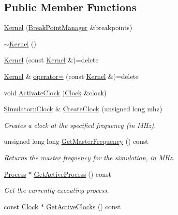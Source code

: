 \subsection*{Public Member Functions}
\begin{DoxyCompactItemize}
\item 
\hyperlink{class_simulator_1_1_kernel_aa5884ec5c226d80b3b66d28b420b38b2}{Kernel} (\hyperlink{class_simulator_1_1_break_point_manager}{Break\+Point\+Manager} \&breakpoints)
\item 
\hyperlink{class_simulator_1_1_kernel_a86bb0e9f2bd1418b975a8144966ab18b}{$\sim$\+Kernel} ()
\item 
\hyperlink{class_simulator_1_1_kernel_a59cea6da9f62b4f048581017a976d546}{Kernel} (const \hyperlink{class_simulator_1_1_kernel}{Kernel} \&)=delete
\item 
\hyperlink{class_simulator_1_1_kernel}{Kernel} \& \hyperlink{class_simulator_1_1_kernel_ae2acb85d7a5011c0eeaaa3555a78ed01}{operator=} (const \hyperlink{class_simulator_1_1_kernel}{Kernel} \&)=delete
\item 
void \hyperlink{class_simulator_1_1_kernel_a85b974b369a76becd119496a3f339ea2}{Activate\+Clock} (\hyperlink{class_simulator_1_1_clock}{Clock} \&clock)
\item 
\hyperlink{class_simulator_1_1_clock}{Simulator\+::\+Clock} \& \hyperlink{class_simulator_1_1_kernel_ae85126f35f2be33dfe63cd4f333e27e8}{Create\+Clock} (unsigned long mhz)
\begin{DoxyCompactList}\small\item\em Creates a clock at the specified frequency (in M\+Hz). \end{DoxyCompactList}\item 
unsigned long long \hyperlink{class_simulator_1_1_kernel_afbf48e6e87a025004375f9c44375e0b9}{Get\+Master\+Frequency} () const 
\begin{DoxyCompactList}\small\item\em Returns the master frequency for the simulation, in M\+Hz. \end{DoxyCompactList}\item 
\hyperlink{class_simulator_1_1_process}{Process} $\ast$ \hyperlink{class_simulator_1_1_kernel_ad2600c251b36facc96fb2f0255834e7e}{Get\+Active\+Process} () const 
\begin{DoxyCompactList}\small\item\em Get the currently executing process. \end{DoxyCompactList}\item 
const \hyperlink{class_simulator_1_1_clock}{Clock} $\ast$ \hyperlink{class_simulator_1_1_kernel_a338d330dfe58d78185acc2e414659ac8}{Get\+Active\+Clocks} () const 

\end{DoxyCompactItemize}
